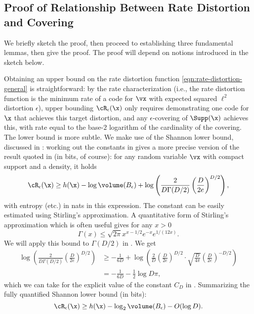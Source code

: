 \documentclass[../../book-main.tex]{subfiles}
\begin{document}
\subsection{Proof of Relationship Between Rate Distortion and Covering}

We briefly sketch the proof, then proceed to establishing three fundamental
lemmas, then give the proof. The proof will depend on notions introduced in the
sketch below.

Obtaining an upper bound on the rate distortion function
\eqref{eqn:rate-distortion-general} is straightforward: by the rate
characterization (i.e., the rate distortion function is the minimum rate of
a code for $\vx$ with expected squared $\ell^2$ distortion $\epsilon$), upper
bounding $\cR_{\epsilon}(\x)$ only requires demonstrating one code for $\x$ that
achieves this target distortion, and any $\epsilon$-covering of $\Supp(\x)$
achieves this, with rate equal to the base-$2$ logarithm of the cardinality of
the covering.
The lower bound is more subtle. We make use of the Shannon lower bound,
discussed in : working out the constants in \cite[\S III,
(22)]{Linder1994-ej} gives a more precise version of the result quoted in
 (in bits, of course): for any random variable $\vx$ with compact
support and a density, it holds
\begin{equation}\label{eq:slb-appendix-1}
    \cR_{\epsilon}(\x)
    \geq
    h(\x)
    - \log \volume(B_{\epsilon})
    +
    \log
    \left(
    \frac{
    	2
    }
    {
    	D \Gamma(D/2)
    }
    \left(
    \frac{
    	D
    }
    {
    	2e
    }
    \right)^{D/2}
    \right),
\end{equation}
with entropy (etc.) in nats in this expression.
The constant can be easily estimated using Stirling's approximation.
A quantitative form of Stirling's approximation which is often useful gives
for any $x > 0$ \cite{Jameson2015-hy}
\begin{equation}
    \Gamma(x) \leq \sqrt{2\pi} x^{x - 1/2} e^{-x} e^{1/(12x)}.
\end{equation}
We will apply this bound to $\Gamma(D/2)$ in .
We get
\begin{align}
    \log
    \left(
    \frac{
        2
    }
    {
        D \Gamma(D/2)
    }
    \left(
    \frac{
        D
    }
    {
        2e
    }
    \right)^{D/2}
    \right)
    &\geq
    -\frac{1}{6D}
    +
    \log\left(
        \frac{2}{D} 
        \left(
        \frac{
            D
        }
        {
            2e
        }
        \right)^{D/2}
        \cdot
        \sqrt{\frac{D}{4\pi}}
        \left(
        \frac{D}{2e}
        \right)^{-D/2}
    \right)
    \\
    &=
    -\frac{1}{6D}
    - \frac{1}{2}\log D\pi,\label{eq:slb-constant-est}
\end{align}
which we can take for the explicit value of the constant $C_D$ in .
Summarizing the fully quantified Shannon lower bound (in bits):
\begin{equation}\label{eq:slb-appendix}
    \cR_{\epsilon}(\x)
    \geq
    h(\x)
    - \log_2 \volume(B_{\epsilon})
    - O(\log D).
\end{equation}
\end{document}
